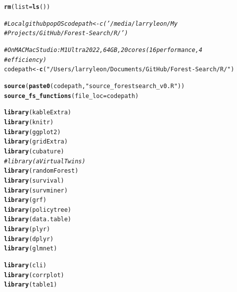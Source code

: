 \documentclass[12pt]{article}
\makeatletter
\newcommand{\hlstr}[1]{\textcolor[rgb]{0.192,0.494,0.8}{#1}}%
\newcommand{\hlcom}[1]{\textcolor[rgb]{0.678,0.584,0.686}{\textit{#1}}}%
\newcommand{\hlstd}[1]{\textcolor[rgb]{0.345,0.345,0.345}{#1}}%
\newcommand{\hlkwb}[1]{\textcolor[rgb]{0.69,0.353,0.396}{#1}}%
\newcommand{\hlkwc}[1]{\textcolor[rgb]{0.333,0.667,0.333}{#1}}%
\newcommand{\hlkwd}[1]{\textcolor[rgb]{0.737,0.353,0.396}{\textbf{#1}}}%
\newenvironment{kframe}{%
 \def\at@end@of@kframe{}%
 \ifinner\ifhmode%
  \def\at@end@of@kframe{\end{minipage}}%
  \begin{minipage}{\columnwidth}%
 \fi\fi%
 \def\FrameCommand##1{\hskip\@totalleftmargin \hskip-\fboxsep
 \colorbox{shadecolor}{##1}\hskip-\fboxsep
     \hskip-\linewidth \hskip-\@totalleftmargin \hskip\columnwidth}%
 \MakeFramed {\advance\hsize-\width
   \@totalleftmargin\z@ \linewidth\hsize
   \@setminipage}}%
 {\par\unskip\endMakeFramed%
 \at@end@of@kframe}
\newenvironment{knitrout}{}{} %
\makeatother
\begin{document}
\begin{knitrout}
\color{fgcolor}\begin{kframe}
\begin{alltt}
\hlkwd{rm}\hlstd{(}\hlkwc{list} \hlstd{=} \hlkwd{ls}\hlstd{())}

\hlcom{# Local github popOS codepath<-c('/media/larryleon/My}
\hlcom{# Projects/GitHub/Forest-Search/R/')}

\hlcom{# On MAC Mac Studio: M1 Ultra 2022, 64GB, 20 cores (16 performance, 4}
\hlcom{# efficiency)}
\hlstd{codepath} \hlkwb{<-} \hlkwd{c}\hlstd{(}\hlstr{"/Users/larryleon/Documents/GitHub/Forest-Search/R/"}\hlstd{)}

\hlkwd{source}\hlstd{(}\hlkwd{paste0}\hlstd{(codepath,} \hlstr{"source_forestsearch_v0.R"}\hlstd{))}
\hlkwd{source_fs_functions}\hlstd{(}\hlkwc{file_loc} \hlstd{= codepath)}

\hlkwd{library}\hlstd{(kableExtra)}
\hlkwd{library}\hlstd{(knitr)}
\hlkwd{library}\hlstd{(ggplot2)}
\hlkwd{library}\hlstd{(gridExtra)}
\hlkwd{library}\hlstd{(cubature)}
\hlcom{# library(aVirtualTwins)}
\hlkwd{library}\hlstd{(randomForest)}
\hlkwd{library}\hlstd{(survival)}
\hlkwd{library}\hlstd{(survminer)}
\hlkwd{library}\hlstd{(grf)}
\hlkwd{library}\hlstd{(policytree)}
\hlkwd{library}\hlstd{(data.table)}
\hlkwd{library}\hlstd{(plyr)}
\hlkwd{library}\hlstd{(dplyr)}
\hlkwd{library}\hlstd{(glmnet)}

\hlkwd{library}\hlstd{(cli)}
\hlkwd{library}\hlstd{(corrplot)}
\hlkwd{library}\hlstd{(table1)}
\end{alltt}
\end{kframe}
\end{knitrout}
\end{document}
